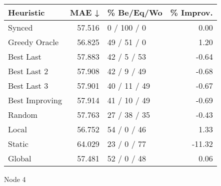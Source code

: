 \begin{tabular}{lrlr}
\toprule
\textbf{Heuristic} & \textbf{MAE ↓} & \textbf{\% Be/Eq/Wo} & \textbf{\% Improv.} \\
\midrule
            Synced &         57.516 &          0 / 100 / 0 &                0.00 \\
     Greedy Oracle &         56.825 &          49 / 51 / 0 &                1.20 \\
         Best Last &         57.883 &          42 / 5 / 53 &               -0.64 \\
       Best Last 2 &         57.908 &          42 / 9 / 49 &               -0.68 \\
       Best Last 3 &         57.901 &         40 / 11 / 49 &               -0.67 \\
    Best Improving &         57.914 &         41 / 10 / 49 &               -0.69 \\
            Random &         57.763 &         27 / 38 / 35 &               -0.43 \\
             Local &         56.752 &          54 / 0 / 46 &                1.33 \\
            Static &         64.029 &          23 / 0 / 77 &              -11.32 \\
            Global &         57.481 &          52 / 0 / 48 &                0.06 \\
\bottomrule
\end{tabular}
\caption{Node 4}
\label{tab:iid_lr05_le1_bs2_4}
